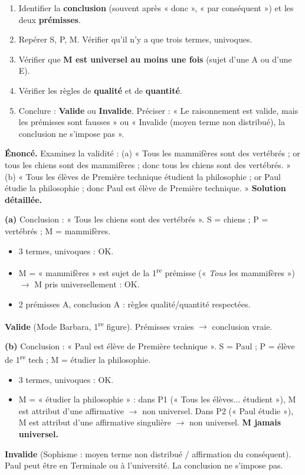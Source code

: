 \documentclass[11pt]{article}
\begin{document}
\begin{methode}
\begin{enumerate}
\item Identifier la \textbf{conclusion} (souvent après « donc », « par conséquent ») et les deux \textbf{prémisses}.
\item Repérer S, P, M. Vérifier qu'il n'y a que trois termes, univoques.
\item Vérifier que \textbf{M est universel au moins une fois} (sujet d'une A ou d'une E).
\item Vérifier les règles de \textbf{qualité} et de \textbf{quantité}.
\item Conclure : \textbf{Valide} ou \textbf{Invalide}. Préciser : « Le raisonnement est valide, mais les prémisses sont fausses » ou « Invalide (moyen terme non distribué), la conclusion ne s'impose pas ».
\end{enumerate}
\end{methode}

\begin{exoresolu}
\textbf{Énoncé.} Examinez la validité :
(a) « Tous les mammifères sont des vertébrés ; or tous les chiens sont des mammifères ; donc tous les chiens sont des vertébrés. »
(b) « Tous les élèves de Première technique étudient la philosophie ; or Paul étudie la philosophie ; donc Paul est élève de Première technique. »
\tcblower
\textbf{Solution détaillée.}

\textbf{(a)} Conclusion : « Tous les chiens sont des vertébrés ». S = chiens ; P = vertébrés ; M = mammifères.
\begin{itemize}
\item 3 termes, univoques : OK.
\item M = « mammifères » est sujet de la 1\textsuperscript{re} prémisse (« \emph{Tous} les mammifères ») $\rightarrow$ M pris universellement : OK.
\item 2 prémisses A, conclusion A : règles qualité/quantité respectées.
\end{itemize}
\textbf{Valide} (Mode Barbara, 1\textsuperscript{re} figure). Prémisses vraies $\rightarrow$ conclusion vraie.

\textbf{(b)} Conclusion : « Paul est élève de Première technique ». S = Paul ; P = élève de 1\textsuperscript{re} tech ; M = étudier la philosophie.
\begin{itemize}
\item 3 termes, univoques : OK.
\item M = « étudier la philosophie » : dans P1 (« Tous les élèves... étudient »), M est attribut d'une affirmative $\rightarrow$ non universel. Dans P2 (« Paul étudie »), M est attribut d'une affirmative singulière $\rightarrow$ non universel. \textbf{M jamais universel.}
\end{itemize}
\textbf{Invalide} (Sophisme : moyen terme non distribué / affirmation du conséquent). Paul peut être en Terminale ou à l'université. La conclusion ne s'impose pas.
\end{exoresolu}
\end{document}
